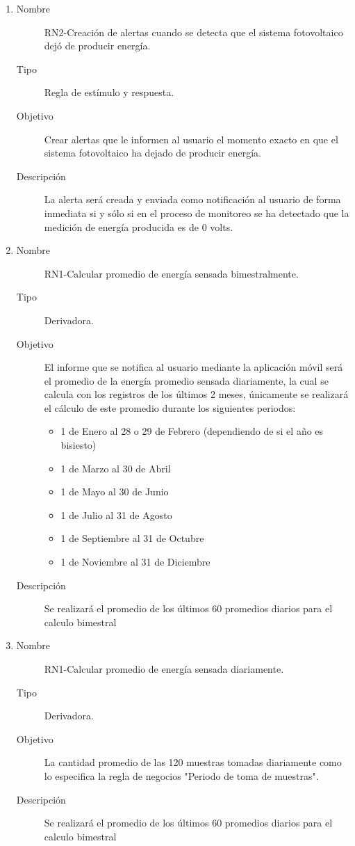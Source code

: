 \begin{enumerate}[label=RN\arabic*.]
    \item \label{RN2}
		\begin{description}
			\item[Nombre] RN2-Creación de alertas cuando se detecta que el sistema fotovoltaico dejó de producir energía.
			\item[Tipo] Regla de estímulo y respuesta.
			\item[Objetivo] Crear alertas que le informen al usuario el momento exacto en que el sistema fotovoltaico ha dejado de producir energía.
			\item[Descripción] La alerta será creada y enviada como notificación al usuario de forma inmediata si y sólo si en el proceso de monitoreo se ha detectado que la medición de energía producida es de 0 volts.  
    		\end{description}
\item \label{RN3}
		\begin{description}
			\item[Nombre] RN1-Calcular promedio de energía sensada bimestralmente.
			\item[Tipo] Derivadora.
			\item[Objetivo] El informe que se notifica al usuario mediante la aplicación móvil será el promedio de la energía promedio sensada diariamente, la cual se calcula con los registros de los últimos 2 meses, únicamente se realizará el cálculo de este promedio durante los siguientes periodos:
			\begin{itemize}
				\item 1 de Enero al 28 o 29 de Febrero (dependiendo de si el año es bisiesto)
				\item 1 de Marzo al 30 de Abril
				\item 1 de Mayo al 30 de Junio
				\item 1 de Julio al 31 de Agosto
				\item 1 de Septiembre al 31 de Octubre
				\item 1 de Noviembre al 31 de Diciembre
			\end{itemize}
			\item[Descripción] Se realizará el promedio de los últimos 60 promedios diarios para el calculo bimestral
		\end{description}

\item \label{RN4}
		\begin{description}
			\item[Nombre] RN1-Calcular promedio de energía sensada diariamente.
			\item[Tipo] Derivadora.
			\item[Objetivo] La cantidad promedio de las 120 muestras tomadas diariamente como lo especifica la regla de negocios "Periodo de toma de muestras".
			\item[Descripción] Se realizará el promedio de los últimos 60 promedios diarios para el calculo bimestral
		\end{description}


\end{enumerate}
